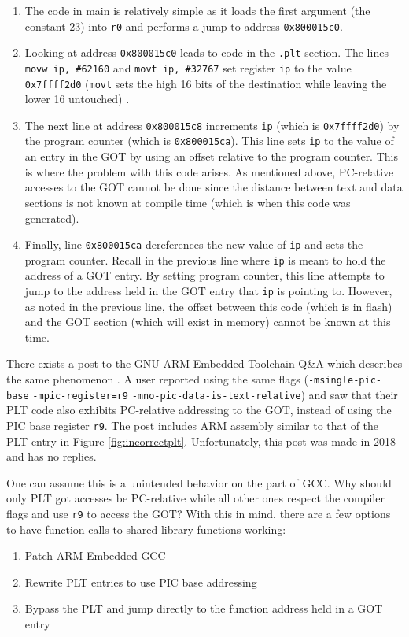 \documentclass[12pt]{ucsddissertation}
\begin{document}
\begin{enumerate}
    \item The code in main is relatively simple as it loads the first argument (the constant 23) into \texttt{r0} and performs a jump to address \texttt{0x800015c0}.
    \item Looking at address \texttt{0x800015c0} leads to code in the \texttt{.plt} section. The lines \texttt{movw	ip, \#62160} and \texttt{movt	ip, \#32767} set register \texttt{ip} to the value \texttt{0x7ffff2d0} (\texttt{movt} sets the high 16 bits of the destination while leaving the lower 16 untouched) \cite{arm-movt}.
    \item The next line at address \texttt{0x800015c8} increments \texttt{ip} (which is \texttt{0x7ffff2d0}) by the program counter (which is \texttt{0x800015ca}). This line sets \texttt{ip} to the value of an entry in the GOT by using an offset relative to the program counter. This is where the problem with this code arises. As mentioned above, PC-relative accesses to the GOT cannot be done since the distance between text and data sections is not known at compile time (which is when this code was generated). 
    \item Finally, line \texttt{0x800015ca} dereferences the new value of \texttt{ip} and sets the program counter. Recall in the previous line where \texttt{ip} is meant to hold the address of a GOT entry. By setting program counter, this line attempts to jump to the address held in the GOT entry that \texttt{ip} is pointing to. However, as noted in the previous line, the offset between this code (which is in flash) and the GOT section (which will exist in memory) cannot be known at this time.
\end{enumerate}


There exists a post to the GNU ARM Embedded Toolchain Q\&A which describes the same phenomenon \cite{wrong-plt}. A user reported using the same flags (\texttt{-msingle-pic-base} \texttt{-mpic-register=r9} \texttt{-mno-pic-data-is-text-relative}) and saw that their PLT code also exhibits PC-relative addressing to the GOT, instead of using the PIC base register \texttt{r9}. The post includes ARM assembly similar to that of the PLT entry in Figure \ref{fig:incorrectplt}. Unfortunately, this post was made in 2018 and has no replies. 

One can assume this is a unintended behavior on the part of GCC. Why should only PLT got accesses be PC-relative while all other ones respect the compiler flags and use \texttt{r9} to access the GOT? With this in mind, there are a few options to have function calls to shared library functions working:
\begin{enumerate}
    \item Patch ARM Embedded GCC 
    \item Rewrite PLT entries to use PIC base addressing
    \item Bypass the PLT and jump directly to the function address held in a GOT entry
\end{enumerate}
\end{document}
